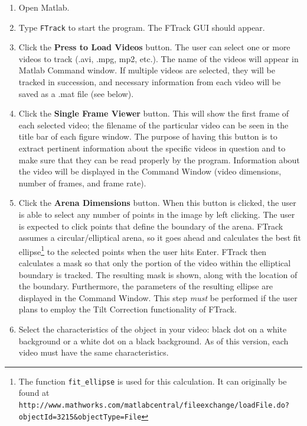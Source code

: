 \documentclass[letterpaper, 11pt]{article}
\begin{document}
\begin{enumerate}
\item Open Matlab.

\item Type \texttt{FTrack} to start the program.  The FTrack GUI should appear.

\item Click the \textbf{Press to Load Videos} button.  The user can select one or more videos to track (.avi, .mpg, mp2,
etc.).  The name of the videos will appear in Matlab Command window.  If multiple videos are
selected, they will be tracked in succession, and necessary information from each video will be
saved as a .mat file (see below).

\item Click the \textbf{Single Frame Viewer} button.  This will show the first frame of each
selected video; the filename of the particular video can be seen in the title bar of each figure
window. The purpose of having this button is to extract pertinent information about the specific
videos in question and to make sure that they can be read properly by the program.  Information
about the video will be displayed in the Command Window (video dimensions, number of frames, and
frame rate).

\item Click the \textbf{Arena Dimensions} button. When this button is clicked, the user is able to select any number of points in the image by left
clicking.  The user is expected to click points that define the boundary of the arena.  FTrack
assumes a circular/elliptical arena, so it goes ahead and calculates the best fit
ellipse\footnote{The function \texttt{fit\_ellipse} is used for this calculation.  It can
originally be found at
\texttt{http://www.mathworks.com/matlabcentral/fileexchange/loadFile.do?objectId=3215\&objectType=File}}
to the selected points when the user hits Enter.  FTrack then calculates a mask so that only the
portion of the video within the elliptical boundary is tracked.  The resulting mask is shown, along
with the location of the boundary.  Furthermore, the parameters of the resulting ellipse are
displayed in the Command Window. This step \emph{must} be performed if the user plans to employ the
Tilt Correction functionality of FTrack.

\item Select the characteristics of the object in your video: black dot on a white background or a
white dot on a black background. As of this version, each video must have the same characteristics.


\end{enumerate}
\end{document}
